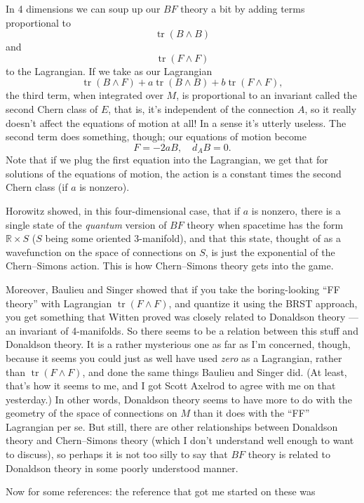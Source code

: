 \documentclass{article}
\begin{document}
In 4 dimensions we can soup up our \(BF\) theory a bit by adding terms
proportional to \[\operatorname{tr}(B \wedge B)\] and
\[\operatorname{tr}(F \wedge F)\] to the Lagrangian. If we take as our
Lagrangian
\[\operatorname{tr}(B \wedge F) + a \operatorname{tr}(B \wedge B) + b \operatorname{tr}(F \wedge F),\]
the third term, when integrated over \(M\), is proportional to an
invariant called the second Chern class of \(E\), that is, it's
independent of the connection \(A\), so it really doesn't affect the
equations of motion at all! In a sense it's utterly useless. The second
term does something, though; our equations of motion become
\[F = -2aB, \quad d_A B = 0.\] Note that if we plug the first equation
into the Lagrangian, we get that for solutions of the equations of
motion, the action is a constant times the second Chern class (if \(a\)
is nonzero).

Horowitz showed, in this four-dimensional case, that if \(a\) is
nonzero, there is a single state of the \emph{quantum} version of \(BF\)
theory when spacetime has the form \(\mathbb{R} \times S\) (\(S\) being
some oriented 3-manifold), and that this state, thought of as a
wavefunction on the space of connections on \(S\), is just the
exponential of the Chern--Simons action. This is how Chern--Simons theory
gets into the game.

Moreover, Baulieu and Singer showed that if you take the boring-looking
``FF theory'' with Lagrangian \(\operatorname{tr}(F \wedge F)\), and
quantize it using the BRST approach, you get something that Witten
proved was closely related to Donaldson theory --- an invariant of
4-manifolds. So there seems to be a relation between this stuff and
Donaldson theory. It is a rather mysterious one as far as I'm concerned,
though, because it seems you could just as well have used \emph{zero} as
a Lagrangian, rather than \(\operatorname{tr}(F \wedge F)\), and done
the same things Baulieu and Singer did. (At least, that's how it seems
to me, and I got Scott Axelrod to agree with me on that yesterday.) In
other words, Donaldson theory seems to have more to do with the geometry
of the space of connections on \(M\) than it does with the ``FF''
Lagrangian per se. But still, there are other relationships between
Donaldson theory and Chern--Simons theory (which I don't understand well
enough to want to discuss), so perhaps it is not too silly to say that
\(BF\) theory is related to Donaldson theory in some poorly understood
manner.

Now for some references: the reference that got me started on these was
\end{document}
